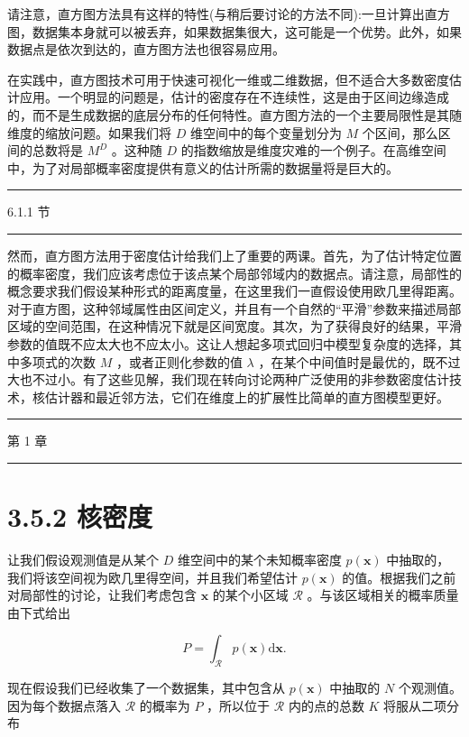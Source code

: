 \documentclass[10pt]{report}
\newcommand{\HRule}{\begin{center}\rule{0.9\linewidth}{0.2mm}\end{center}}
\begin{document}
请注意，直方图方法具有这样的特性(与稍后要讨论的方法不同):一旦计算出直方图，数据集本身就可以被丢弃，如果数据集很大，这可能是一个优势。此外，如果数据点是依次到达的，直方图方法也很容易应用。

在实践中，直方图技术可用于快速可视化一维或二维数据，但不适合大多数密度估计应用。一个明显的问题是，估计的密度存在不连续性，这是由于区间边缘造成的，而不是生成数据的底层分布的任何特性。直方图方法的一个主要局限性是其随维度的缩放问题。如果我们将 \(D\) 维空间中的每个变量划分为 \(M\) 个区间，那么区间的总数将是 \({M}^{D}\) 。这种随 \(D\) 的指数缩放是维度灾难的一个例子。在高维空间中，为了对局部概率密度提供有意义的估计所需的数据量将是巨大的。

\HRule

6.1.1 节

\HRule

然而，直方图方法用于密度估计给我们上了重要的两课。首先，为了估计特定位置的概率密度，我们应该考虑位于该点某个局部邻域内的数据点。请注意，局部性的概念要求我们假设某种形式的距离度量，在这里我们一直假设使用欧几里得距离。对于直方图，这种邻域属性由区间定义，并且有一个自然的“平滑”参数来描述局部区域的空间范围，在这种情况下就是区间宽度。其次，为了获得良好的结果，平滑参数的值既不应太大也不应太小。这让人想起多项式回归中模型复杂度的选择，其中多项式的次数 \(M\) ，或者正则化参数的值 \(\lambda\) ，在某个中间值时是最优的，既不过大也不过小。有了这些见解，我们现在转向讨论两种广泛使用的非参数密度估计技术，核估计器和最近邻方法，它们在维度上的扩展性比简单的直方图模型更好。

\HRule

第 1 章

\HRule

\section*{3.5.2 核密度}

让我们假设观测值是从某个 \(D\) 维空间中的某个未知概率密度 \(p\left( \mathbf{x}\right)\) 中抽取的，我们将该空间视为欧几里得空间，并且我们希望估计 \(p\left( \mathbf{x}\right)\) 的值。根据我们之前对局部性的讨论，让我们考虑包含 \(\mathbf{x}\) 的某个小区域 \(\mathcal{R}\) 。与该区域相关的概率质量由下式给出

\[
P = {\int }_{\mathcal{R}}p\left( \mathbf{x}\right) \mathrm{d}\mathbf{x}. \tag{3.176}
\]

现在假设我们已经收集了一个数据集，其中包含从 \(p\left( \mathbf{x}\right)\) 中抽取的 \(N\) 个观测值。因为每个数据点落入 \(\mathcal{R}\) 的概率为 \(P\) ，所以位于 \(\mathcal{R}\) 内的点的总数 \(K\) 将服从二项分布
\end{document}
